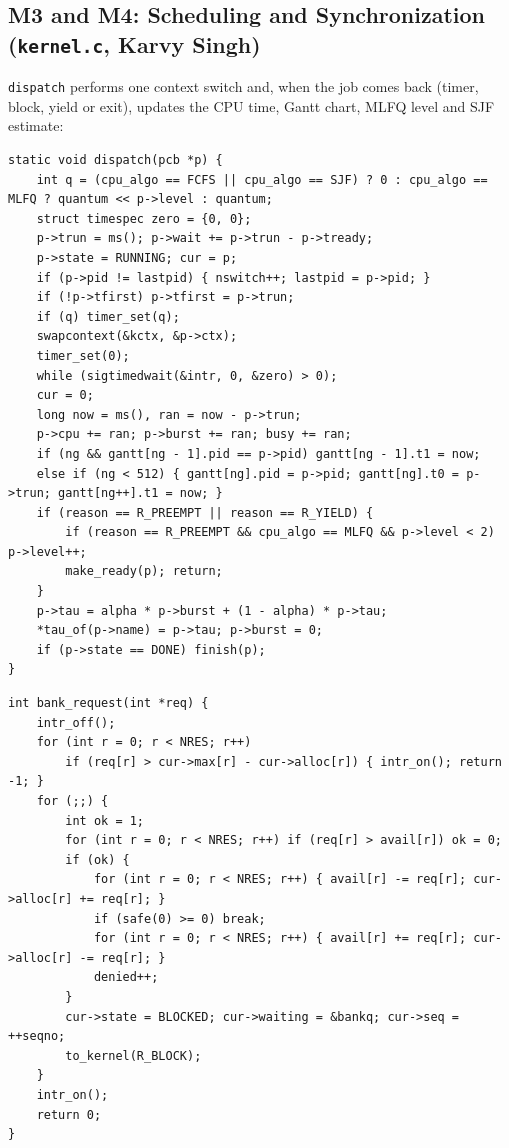 \documentclass[12pt,a4paper]{article}
\begin{document}
\subsection{M3 and M4: Scheduling and Synchronization (\texttt{kernel.c}, Karvy Singh)}

\texttt{dispatch} performs one context switch and, when the job comes back (timer, block, yield or exit), updates the CPU time, Gantt chart, MLFQ level and SJF estimate:

\noindent\begin{minipage}{\linewidth}
\begin{lstlisting}[firstnumber=144, caption={Dispatching a job (\texttt{kernel.c})}]
static void dispatch(pcb *p) {
    int q = (cpu_algo == FCFS || cpu_algo == SJF) ? 0 : cpu_algo == MLFQ ? quantum << p->level : quantum;
    struct timespec zero = {0, 0};
    p->trun = ms(); p->wait += p->trun - p->tready;
    p->state = RUNNING; cur = p;
    if (p->pid != lastpid) { nswitch++; lastpid = p->pid; }
    if (!p->tfirst) p->tfirst = p->trun;
    if (q) timer_set(q);
    swapcontext(&kctx, &p->ctx);
    timer_set(0);
    while (sigtimedwait(&intr, 0, &zero) > 0);
    cur = 0;
    long now = ms(), ran = now - p->trun;
    p->cpu += ran; p->burst += ran; busy += ran;
    if (ng && gantt[ng - 1].pid == p->pid) gantt[ng - 1].t1 = now;
    else if (ng < 512) { gantt[ng].pid = p->pid; gantt[ng].t0 = p->trun; gantt[ng++].t1 = now; }
    if (reason == R_PREEMPT || reason == R_YIELD) {
        if (reason == R_PREEMPT && cpu_algo == MLFQ && p->level < 2) p->level++;
        make_ready(p); return;
    }
    p->tau = alpha * p->burst + (1 - alpha) * p->tau;
    *tau_of(p->name) = p->tau; p->burst = 0;
    if (p->state == DONE) finish(p);
}
\end{lstlisting}
\end{minipage}

\noindent\begin{minipage}{\linewidth}
\begin{lstlisting}[firstnumber=395, caption={Banker's resource-request algorithm (\texttt{kernel.c})}]
int bank_request(int *req) {
    intr_off();
    for (int r = 0; r < NRES; r++)
        if (req[r] > cur->max[r] - cur->alloc[r]) { intr_on(); return -1; }
    for (;;) {
        int ok = 1;
        for (int r = 0; r < NRES; r++) if (req[r] > avail[r]) ok = 0;
        if (ok) {
            for (int r = 0; r < NRES; r++) { avail[r] -= req[r]; cur->alloc[r] += req[r]; }
            if (safe(0) >= 0) break;
            for (int r = 0; r < NRES; r++) { avail[r] += req[r]; cur->alloc[r] -= req[r]; }
            denied++;
        }
        cur->state = BLOCKED; cur->waiting = &bankq; cur->seq = ++seqno;
        to_kernel(R_BLOCK);
    }
    intr_on();
    return 0;
}
\end{lstlisting}
\end{minipage}
\end{document}
